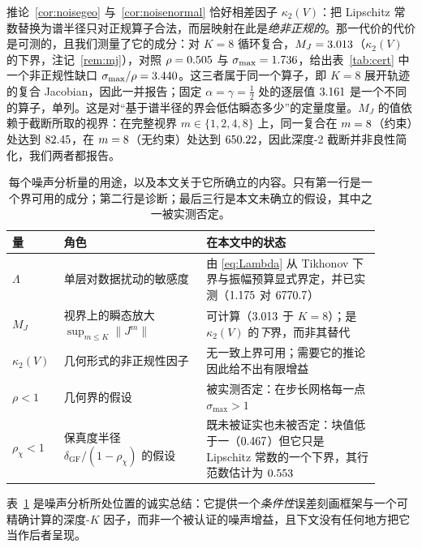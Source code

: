 \documentclass[UTF8,a4paper,11pt]{ctexart}
\newcommand{\norm}[1]{\lVert #1 \rVert}
\newcommand{\numv}[1]{#1}
\begin{document}
推论~\ref{cor:noisegeo} 与~\ref{cor:noisenormal} 恰好相差因子 $\kappa_2(V)$：把 Lipschitz 常数替换为谱半径只对正规算子合法，而层映射在此是\emph{绝非正规的}。那一代价的代价是可测的，且我们测量了它的成分：对 $K{=}8$ 循环复合，$M_J=\numv{\NumMJCons}$（$\kappa_2(V)$ 的下界，注记~\ref{rem:mj}），对照 $\rho=\numv{\NumRhoComp}$ 与 $\sigma_{\max}=\numv{\NumSigCompCons}$，给出表~\ref{tab:cert} 中一个非正规性缺口 $\sigma_{\max}/\rho=\numv{\NumGapRatio}$。这三者属于同一个算子，即 $K{=}8$ 展开轨迹的复合 Jacobian，因此一并报告；固定 $\alpha=\gamma=\tfrac12$ 处的逐层值 $\numv{\NumSigCompLayerCons}$ 是一个不同的算子，单列。这是对“基于谱半径的界会低估瞬态多少”的定量度量。$M_J$ 的值依赖于截断所取的视界：在完整视界 $m\in\{1,2,4,8\}$ 上，同一复合在 $m=\numv{\NumMJFullArgmaxM}$（约束）处达到 $\numv{\NumMJFullCons}$，在 $m=\numv{\NumMJFullArgmaxMUnc}$（无约束）处达到 $\numv{\NumMJFullUnc}$，因此深度-2 截断并非良性简化，我们两者都报告。

\begin{table}[htbp]
\centering
\caption{每个噪声分析量的用途，以及本文关于它所确立的内容。只有第一行是一个界可用的成分；第二行是诊断；最后三行是本文未确立的假设，其中之一被实测否定。}
\label{tab:noisestatus}
\small
\begin{tabular}{@{}p{0.10\linewidth}p{0.36\linewidth}p{0.44\linewidth}@{}}
\toprule
量 & 角色 & 在本文中的状态 \\
\midrule
$\Lambda$ & 单层对数据扰动的敏感度 & 由 \eqref{eq:Lambda} 从 Tikhonov 下界与振幅预算显式界定，并已实测（$\numv{\NumLambdaMeas}$ 对 $\numv{\NumLambdaBound}$） \\
$M_J$ & 视界上的瞬态放大 $\sup_{m\le K}\norm{J^{m}}$ & 可计算（$\numv{\NumMJCons}$ 于 $K{=}8$）；是 $\kappa_2(V)$ 的\emph{下}界，而非其替代 \\
$\kappa_2(V)$ & 几何形式的非正规性因子 & 无一致上界可用；需要它的推论因此给不出有限增益 \\
$\rho<1$ & 几何界的假设 & 被实测否定：在步长网格每一点 $\sigma_{\max}>1$ \\
$\rho_\chi<1$ & 保真度半径 $\delta_{\mathrm{GF}}/(1-\rho_\chi)$ 的假设 & 既未被证实也未被否定：块值低于一（$\numv{\NumRhoChiCons}$）但它只是 Lipschitz 常数的一个下界，其行范数估计为 $\numv{\NumChiLipRowCons}$ \\
\bottomrule
\end{tabular}
\end{table}
表~\ref{tab:noisestatus} 是噪声分析所处位置的诚实总结：它提供一个\emph{条件性}误差刻画框架与一个可精确计算的深度-$K$ 因子，而非一个被认证的噪声增益，且下文没有任何地方把它当作后者呈现。
\end{document}
